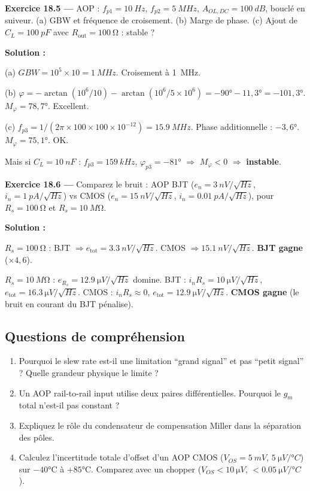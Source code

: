 \documentclass[12pt,a4paper,twoside]{book}
\begin{document}
\textbf{Exercice 18.5 ---} AOP : $f_{p1} = \SI{10}{Hz}$, $f_{p2} = \SI{5}{MHz}$, $A_{OL,DC} = \SI{100}{dB}$, bouclé en suiveur. (a) GBW et fréquence de croisement. (b) Marge de phase. (c) Ajout de $C_L = \SI{100}{pF}$ avec $R_{\text{out}} = \SI{100}{\ohm}$ : stable ?

\begin{pratique}
\textbf{Solution :}

(a) $GBW = 10^5\times10 = \SI{1}{MHz}$. Croisement à \SI{1}{MHz}.

(b) $\varphi = -\arctan(10^6/10) - \arctan(10^6/5\times10^6) = -90° - 11{,}3° = -101{,}3°$. $M_\varphi = 78{,}7°$. Excellent.

(c) $f_{p3} = 1/(2\pi\times100\times100\times10^{-12}) = \SI{15.9}{MHz}$. Phase additionnelle : $-3{,}6°$. $M_\varphi = 75{,}1°$. OK.

Mais si $C_L = \SI{10}{nF}$ : $f_{p3} = \SI{159}{kHz}$, $\varphi_{p3} = -81°$ $\Rightarrow$ $M_\varphi < 0$ $\Rightarrow$ \textbf{instable}.
\end{pratique}

\textbf{Exercice 18.6 ---} Comparez le bruit : AOP BJT ($e_n = \SI{3}{nV/\sqrt{Hz}}$, $i_n = \SI{1}{pA/\sqrt{Hz}}$) vs CMOS ($e_n = \SI{15}{nV/\sqrt{Hz}}$, $i_n = \SI{0.01}{pA/\sqrt{Hz}}$), pour $R_s = \SI{100}{\ohm}$ et $R_s = \SI{10}{M\ohm}$.

\begin{pratique}
\textbf{Solution :}

$R_s = \SI{100}{\ohm}$ : BJT $\Rightarrow e_{\text{tot}} = \SI{3.3}{nV/\sqrt{Hz}}$. CMOS $\Rightarrow \SI{15.1}{nV/\sqrt{Hz}}$. \textbf{BJT gagne} ($\times 4{,}6$).

$R_s = \SI{10}{M\ohm}$ : $e_{R_s} = \SI{12.9}{\micro V/\sqrt{Hz}}$ domine. BJT : $i_n R_s = \SI{10}{\micro V/\sqrt{Hz}}$, $e_{\text{tot}} = \SI{16.3}{\micro V/\sqrt{Hz}}$. CMOS : $i_n R_s \approx 0$, $e_{\text{tot}} = \SI{12.9}{\micro V/\sqrt{Hz}}$. \textbf{CMOS gagne} (le bruit en courant du BJT pénalise).
\end{pratique}

\subsection*{Questions de compréhension}

\begin{enumerate}[nosep]
\item Pourquoi le slew rate est-il une limitation ``grand signal'' et pas ``petit signal'' ? Quelle grandeur physique le limite ?
\item Un AOP rail-to-rail input utilise deux paires différentielles. Pourquoi le $g_m$ total n'est-il pas constant ?
\item Expliquez le rôle du condensateur de compensation Miller dans la séparation des pôles.
\item Calculez l'incertitude totale d'offset d'un AOP CMOS ($V_{OS} = \SI{5}{mV}$, $\SI{5}{\micro V/°C}$) sur $-40°$C à $+85°$C. Comparez avec un chopper ($V_{OS} < \SI{10}{\micro V}$, $< \SI{0.05}{\micro V/°C}$).
\end{enumerate}
\end{document}
